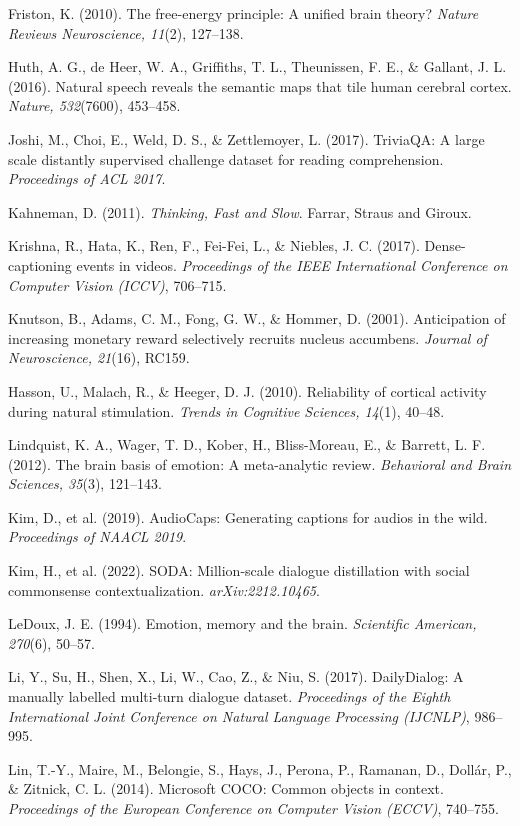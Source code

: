 \documentclass[11pt,letterpaper]{article}
\begin{document}
Friston, K. (2010). The free-energy principle: A unified brain theory? \textit{Nature Reviews Neuroscience, 11}(2), 127--138.

Huth, A. G., de Heer, W. A., Griffiths, T. L., Theunissen, F. E., \& Gallant, J. L. (2016). Natural speech reveals the semantic maps that tile human cerebral cortex. \textit{Nature, 532}(7600), 453--458.

Joshi, M., Choi, E., Weld, D. S., \& Zettlemoyer, L. (2017). TriviaQA: A large scale distantly supervised challenge dataset for reading comprehension. \textit{Proceedings of ACL 2017}.

Kahneman, D. (2011). \textit{Thinking, Fast and Slow}. Farrar, Straus and Giroux.

Krishna, R., Hata, K., Ren, F., Fei-Fei, L., \& Niebles, J. C. (2017). Dense-captioning events in videos. \textit{Proceedings of the IEEE International Conference on Computer Vision (ICCV)}, 706--715.

Knutson, B., Adams, C. M., Fong, G. W., \& Hommer, D. (2001). Anticipation of increasing monetary reward selectively recruits nucleus accumbens. \textit{Journal of Neuroscience, 21}(16), RC159.

Hasson, U., Malach, R., \& Heeger, D. J. (2010). Reliability of cortical activity during natural stimulation. \textit{Trends in Cognitive Sciences, 14}(1), 40--48.

Lindquist, K. A., Wager, T. D., Kober, H., Bliss-Moreau, E., \& Barrett, L. F. (2012). The brain basis of emotion: A meta-analytic review. \textit{Behavioral and Brain Sciences, 35}(3), 121--143.

Kim, D., et al. (2019). AudioCaps: Generating captions for audios in the wild. \textit{Proceedings of NAACL 2019}.

Kim, H., et al. (2022). SODA: Million-scale dialogue distillation with social commonsense contextualization. \textit{arXiv:2212.10465}.

LeDoux, J. E. (1994). Emotion, memory and the brain. \textit{Scientific American, 270}(6), 50--57.

Li, Y., Su, H., Shen, X., Li, W., Cao, Z., \& Niu, S. (2017). DailyDialog: A manually labelled multi-turn dialogue dataset. \textit{Proceedings of the Eighth International Joint Conference on Natural Language Processing (IJCNLP)}, 986--995.

Lin, T.-Y., Maire, M., Belongie, S., Hays, J., Perona, P., Ramanan, D., Doll\'{a}r, P., \& Zitnick, C. L. (2014). Microsoft COCO: Common objects in context. \textit{Proceedings of the European Conference on Computer Vision (ECCV)}, 740--755.
\end{document}
